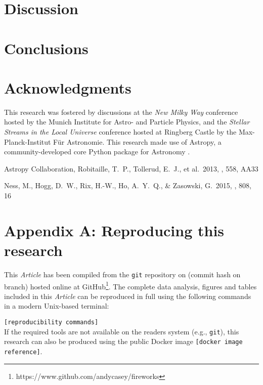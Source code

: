 \documentclass[useAMS,usenatbib]{mn2e}
\newcommand\article{\textit{Article}}
\begin{document}



\section{Discussion}





\section{Conclusions}

% 


\section*{Acknowledgments}
This research was fostered by discussions at the \textit{New Milky Way}
conference hosted by the Munich Institute for Astro- and Particle Physics, and
the \textit{Stellar Streams in the Local Universe} conference hosted at Ringberg
Castle by the Max-Planck-Institut F\"ur Astronomie. This research made use of 
Astropy, a community-developed core Python package for Astronomy \citep{astropy}.

\begin{thebibliography}{99}
 Astropy Collaboration, Robitaille, T.~P., Tollerud, E.~J., et al.\ 2013, \aap, 558, AA33

 Ness, M., Hogg, D.~W., 
Rix, H.-W., Ho, A.~Y.~Q., \& Zasowski, G.\ 2015, \apj, 808, 16 
\end{thebibliography}


\label{lastpage}

\section{Appendix A: Reproducing this research}
This \article{} has been compiled from the \texttt{git} repository on \gitAuthorDate{} (commit hash \texttt{\gitAbbrevHash} on \texttt{\gitBranch} branch) hosted online at GitHub\footnote{https://www.github.com/andycasey/fireworks}. The complete data analysis, figures and tables included in this \article{} can be reproduced in full using the following commands in a modern Unix-based terminal:
\vspace{0.5em}

\noindent\texttt{[reproducibility commands]} 
\vspace{0.5em} \\
If the required tools are not available on the readers system (e.g., \texttt{git}), this research can also be produced using the public Docker image \texttt{[docker image reference]}.
\end{document}
